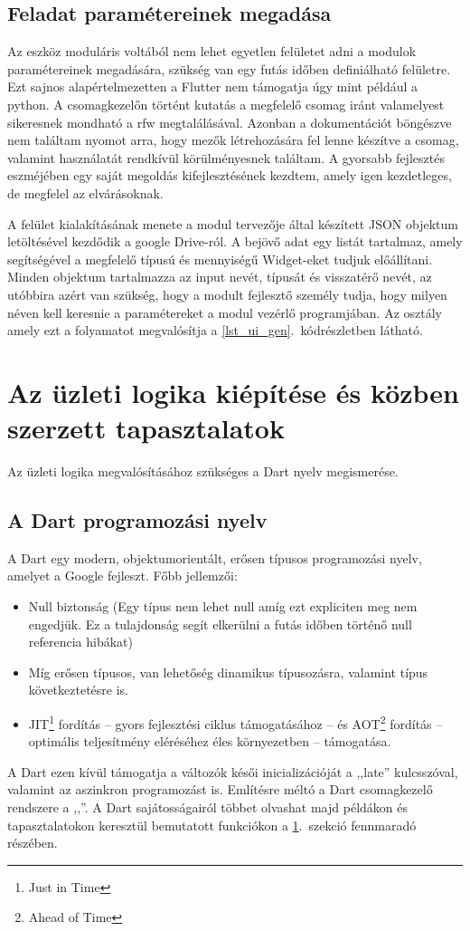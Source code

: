 \documentclass{thesis-ekf}
\theoremstyle{definition}
\theoremstyle{remark}
\begin{document}
	\subsection{Feladat paramétereinek megadása}
	Az eszköz moduláris voltából nem lehet egyetlen felületet adni a modulok paramétereinek megadására, szükség van egy futás időben definiálható felületre. Ezt sajnos alapértelmezetten a Flutter nem támogatja úgy mint például a python. A csomagkezelőn történt kutatás a megfelelő csomag iránt valamelyest sikeresnek mondható a rfw\cite{bib_flutter_rfw} megtalálásával. Azonban a dokumentációt böngészve nem találtam nyomot arra, hogy mezők létrehozására fel lenne készítve a csomag, valamint használatát rendkívül körülményesnek találtam. A gyorsabb fejlesztés eszméjében egy saját megoldás kifejlesztésének kezdtem, amely igen kezdetleges, de megfelel az elvárásoknak.
	
	A felület kialakításának menete a modul tervezője által készített JSON objektum letöltésével kezdődik a google Drive-ról. A bejövő adat egy listát tartalmaz, amely segítségével a megfelelő típusú és mennyiségű Widget-eket tudjuk előállítani. Minden objektum tartalmazza az input nevét, típusát és visszatérő nevét, az utóbbira azért van szükség, hogy a modult fejlesztő személy tudja, hogy milyen néven kell keresnie a paramétereket a modul vezérlő programjában. Az osztály amely ezt a folyamatot megvalósítja a \ref{lst_ui_gen}.~kódrészletben látható.
	
	\section{Az üzleti logika kiépítése és közben szerzett tapasztalatok}
	\label{sec_busines_logi}
	Az üzleti logika megvalósításához szükséges a Dart nyelv megismerése.
	\subsection{A Dart programozási nyelv}
	A Dart egy modern, objektumorientált, erősen típusos programozási nyelv, amelyet a Google fejleszt.
	Főbb jellemzői:
	\begin{itemize}
		\item Null biztonság (Egy típus nem lehet null amíg ezt expliciten meg nem engedjük. Ez a tulajdonság segít elkerülni a futás időben történő null referencia hibákat)
		\item Míg erősen típusos, van lehetőség dinamikus típusozásra, valamint típus következtetésre is.
		\item JIT\footnote{Just in Time} fordítás -- gyors fejlesztési ciklus támogatásához -- és AOT\footnote{Ahead of Time} fordítás -- optimális teljesítmény eléréséhez éles környezetben -- támogatása.
	\end{itemize}
	A Dart ezen kívül támogatja a változók késői inicializációját a ,,late'' kulcsszóval, valamint az aszinkron programozást is. Említésre méltó a Dart csomagkezelő rendszere a ,,\href{https://pub.dev/}{\color{blue}{Pub.dev}}''.
	A Dart sajátosságairól többet olvashat majd példákon és tapasztalatokon keresztül bemutatott funkciókon a \ref{sec_busines_logi}.~szekció fennmaradó részében.
\end{document}
